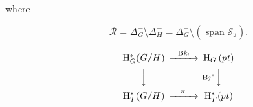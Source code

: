 \documentclass[uplatex,dvipdfmx]{jsarticle}
\begin{document}
where

\begin{equation}
    \mathcal{R}
    =
    \Delta_G^- \setminus \Delta_H^-
    =
    \Delta_G^- \setminus (\operatorname{span} \mathcal{S}_\mathfrak{p}).
\end{equation}

\begin{equation}
    \begin{CD}
        \mathrm{H}^*_G(G/H) @>{\mathrm{B}k_!}>> \mathrm{H}_G\left( pt \right) \\
        @VVV    @V{\mathrm{B}j^*}VV \\
        \mathrm{H}^*_T(G/H) @>{\pi_!}>> \mathrm{H}^*_T(pt) 
     \end{CD}
\end{equation}
\end{document}
